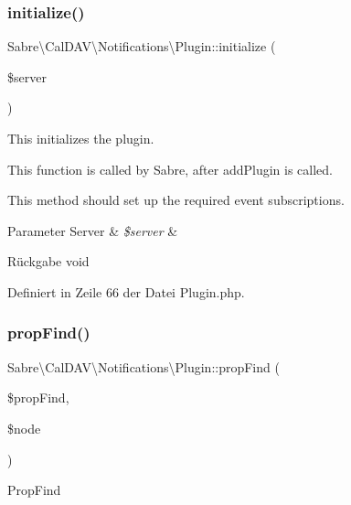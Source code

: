 \subsubsection{\texorpdfstring{initialize()}{initialize()}}
{\footnotesize\ttfamily Sabre\textbackslash{}\+Cal\+D\+A\+V\textbackslash{}\+Notifications\textbackslash{}\+Plugin\+::initialize (\begin{DoxyParamCaption}\item[{\mbox{\hyperlink{class_sabre_1_1_d_a_v_1_1_server}{Server}}}]{\$server }\end{DoxyParamCaption})}

This initializes the plugin.

This function is called by Sabre, after add\+Plugin is called.

This method should set up the required event subscriptions.


\begin{DoxyParams}[1]{Parameter}
Server & {\em \$server} & \\
\hline
\end{DoxyParams}
\begin{DoxyReturn}{Rückgabe}
void 
\end{DoxyReturn}


Definiert in Zeile 66 der Datei Plugin.\+php.

\mbox{\label{class_sabre_1_1_cal_d_a_v_1_1_notifications_1_1_plugin_afe5c2113cdf8ba5c86cb966cc61a1835}} 
\subsubsection{\texorpdfstring{prop\+Find()}{propFind()}}
{\footnotesize\ttfamily Sabre\textbackslash{}\+Cal\+D\+A\+V\textbackslash{}\+Notifications\textbackslash{}\+Plugin\+::prop\+Find (\begin{DoxyParamCaption}\item[{\mbox{\hyperlink{class_sabre_1_1_d_a_v_1_1_prop_find}{Prop\+Find}}}]{\$prop\+Find,  }\item[{Base\+I\+Node}]{\$node }\end{DoxyParamCaption})}

Prop\+Find


